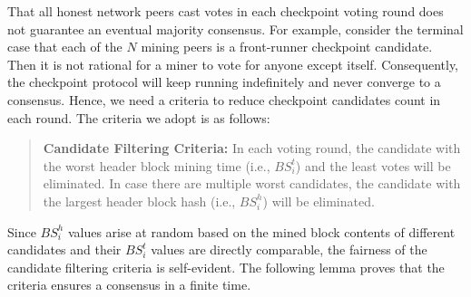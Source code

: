 That all honest network peers cast votes in each checkpoint voting round does not guarantee an eventual majority consensus. For example, consider the terminal case that each of the $N$ mining peers is a front-runner checkpoint candidate. Then it is not rational for a miner to vote for anyone except itself. Consequently, the checkpoint protocol will keep running indefinitely and never converge to a consensus. Hence, we need a criteria to reduce checkpoint candidates count in each round. The criteria we adopt is as follows:

\begin{quotation}
\textbf{Candidate Filtering Criteria:} In each voting round, the candidate with the worst header block mining time (i.e., $BS_i^t$) and the least votes will be eliminated. In case there are multiple worst candidates, the candidate with the largest header block hash (i.e., $BS_i^h$) will be eliminated.   
\end{quotation}        

Since $BS_i^h$ values arise at random based on the mined block contents of different candidates and their $BS_i^t$ values are directly comparable, the fairness of the candidate filtering criteria is self-evident. The following lemma proves that the criteria ensures a consensus in a finite time.

